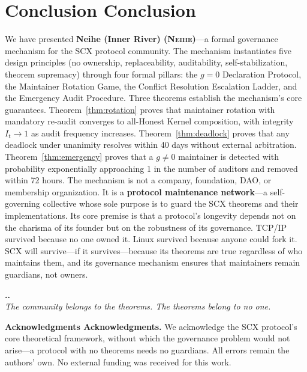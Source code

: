 \documentclass[12pt,a4paper]{article}
\theoremstyle{definition}
\newcommand{\Neihe}{\textsc{Neihe}}
\newcommand{\gzero}{g=0}
\newcommand{\gnonzero}{g \neq 0}
\begin{document}
\section{Conclusion Conclusion}
\label{sec:conclusion}
We have presented \textbf{Neihe (Inner River) (\Neihe{})}---a formal governance mechanism for the SCX protocol community. The mechanism instantiates five design principles (no ownership, replaceability, auditability, self-stabilization, theorem supremacy) through four formal pillars: the $\gzero$ Declaration Protocol, the Maintainer Rotation Game, the Conflict Resolution Escalation Ladder, and the Emergency Audit Procedure.
Three theorems establish the mechanism's core guarantees. Theorem~\ref{thm:rotation} proves that maintainer rotation with mandatory re-audit converges to all-Honest Kernel composition, with integrity $I_t \to 1$ as audit frequency increases. Theorem~\ref{thm:deadlock} proves that any deadlock under unanimity resolves within 40 days without external arbitration. Theorem~\ref{thm:emergency} proves that a $\gnonzero$ maintainer is detected with probability exponentially approaching 1 in the number of auditors and removed within 72 hours.
The mechanism is not a company, foundation, DAO, or membership organization. It is a \textbf{protocol maintenance network}---a self-governing collective whose sole purpose is to guard the SCX theorems and their implementations. Its core premise is that a protocol's longevity depends not on the charisma of its founder but on the robustness of its governance. TCP/IP survived because no one owned it. Linux survived because anyone could fork it. SCX will survive---if it survives---because its theorems are true regardless of who maintains them, and its governance mechanism ensures that maintainers remain guardians, not owners.
\medskip
\begin{center}
\textbf{..}\\[4pt]
\textit{The community belongs to the theorems. The theorems belong to no one.}
\end{center}
\medskip
\noindent\textbf{Acknowledgments Acknowledgments.} We acknowledge the SCX protocol's core theoretical framework, without which the governance problem would not arise---a protocol with no theorems needs no guardians. All errors remain the authors' own. No external funding was received for this work.
\end{document}

